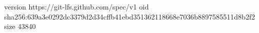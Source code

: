 version https://git-lfs.github.com/spec/v1
oid sha256:639a3e0292dc3379d2d34cffb41ebd351362118668e7036b8897585511d8b2f2
size 43840
